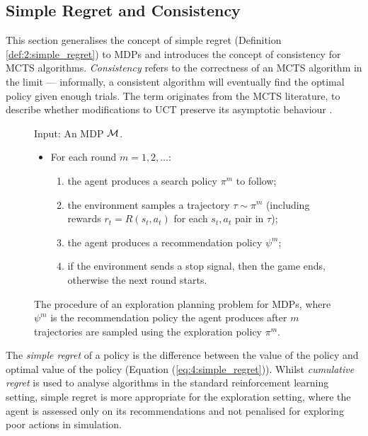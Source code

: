 \subsection{Simple Regret and Consistency}

    This section generalises the concept of simple regret (Definition \ref{def:2:simple_regret}) to MDPs and introduces the concept of consistency for MCTS algorithms.  \textit{Consistency} refers to the correctness of an MCTS algorithm in the limit — informally, a consistent algorithm will eventually find the optimal policy given enough trials. The term originates from the MCTS literature, to describe whether modifications to UCT preserve its asymptotic behaviour \cite{consistency,mcts_survey,poly_uct}.

    \begin{figure}
        \begin{tcolorbox}
            Input: An MDP $\mathcal{M}$.
            \begin{itemize}
                \item For each round $m=1,2,\ldots$:
                \begin{enumerate}
                    \item the agent produces a search policy $\pi^m$ to follow;
                    \item the environment samples a trajectory $\tau\sim\pi^m$ (including rewards $r_t=R(s_t,a_t)$ for each $s_t,a_t$ pair in $\tau$);
                    \item the agent produces a recommendation policy $\psi^m$;
                    \item if the environment sends a stop signal, then the game ends, otherwise the next round starts.
                \end{enumerate} 
            \end{itemize}
        \end{tcolorbox}
        \caption[The procedure of an exploration planning problem for MDPs.]{The procedure of an exploration planning problem for MDPs, where $\psi^m$ is the recommendation policy the agent produces after $m$ trajectories are sampled using the exploration policy $\pi^m$.}
        \label{fig:4:planning_problem}
    \end{figure}

    The \textit{simple regret} of a policy is the difference between the value of the policy and optimal value of the policy (Equation (\ref{eq:4:simple_regret})). Whilst \textit{cumulative regret} is used to analyse algorithms in the standard reinforcement learning setting, simple regret is more appropriate for the exploration setting, where the agent is assessed only on its recommendations and not penalised for exploring poor actions in simulation.

